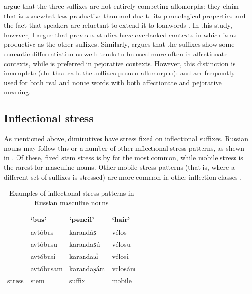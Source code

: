 \documentclass[output=paper,colorlinks,citecolor=brown
]{langscibook}
\begin{document}
\citet{Magomedova.Slioussar2017} argue that the three suffixes are not entirely competing allomorphs: %
they claim that \ok{} is somewhat less productive than \ik{} and \chik{} due to its phonological properties and the fact that speakers are reluctant to extend it to loanwords \citep[see][]{Gouskova.etal2015,Magomedova2017}. In this study, however, I argue that previous studies have overlooked contexts in which \ok{} is as productive as the other suffixes. Similarly, \citet{Magomedova2017} argues that the suffixes show some semantic differentiation as well: \ik{} tends to be used more often in affectionate contexts, while \ok{} is preferred in pejorative contexts. However, this distinction is incomplete (she thus calls the suffixes pseudo-allomorphs): \ik{} and \ok{} are frequently used for both real and nonce words with both affectionate and pejorative meaning. %

\subsection{Inflectional stress}\label{sec:strbg}
As mentioned above, \ok{} diminutives have stress fixed on inflectional suffixes. Russian nouns may follow this or a number of other inflectional stress patterns, as shown in . Of these, fixed stem stress is by far the most common, while mobile stress is the rarest for masculine nouns. Other mobile stress patterns (that is, where a different set of suffixes is stressed) are more common in other inflection classes \citep{Brown.etal1996}.
\begin{table}
\begin{tabular}{l@{ }llll}
\lsptoprule
&& `bus' & `pencil' & `hair'\\
\midrule
\SG{} & \NOM{} & avtóbus & karandáʂ & vólos\\
\SG{} & \DAT{} & avtóbusu & karandaʂú & vólosu\\
\PL{} & \NOM{} & avtóbusɨ & karandaʂɨ́ & vólosɨ\\
\PL{} & \DAT{} & avtóbusam & karandaʂám & volosám\\[.5ex]
\multicolumn{2}{l}{stress} & stem & suffix & mobile\\
\lspbottomrule
\end{tabular}
\caption{Examples of inflectional stress patterns in Russian masculine nouns}
\label{tab:inflex}
\end{table}
\end{document}
